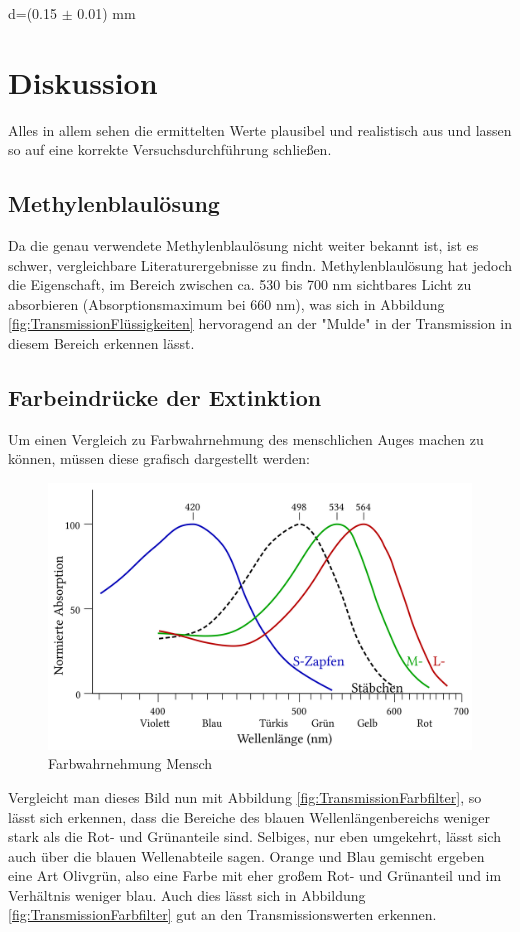 \documentclass[12pt,a4paper,twoside]{article}
\begin{document}
\noindent
d=(0.15 $\pm$ 0.01) mm




\section{Diskussion} %

Alles in allem sehen die ermittelten Werte plausibel und realistisch aus und lassen so auf eine korrekte Versuchsdurchführung schließen.

\subsection{Methylenblaulösung}
Da die genau verwendete Methylenblaulösung nicht weiter bekannt ist, ist es schwer, vergleichbare Literaturergebnisse zu findn.
Methylenblaulösung hat jedoch die Eigenschaft, im Bereich zwischen ca. 530 bis 700 nm sichtbares Licht zu absorbieren (Absorptionsmaximum bei 660 nm), was sich in Abbildung \ref{fig:TransmissionFlüssigkeiten} hervoragend an der "Mulde" in der Transmission in diesem Bereich erkennen lässt.
\cite{Methylenblaulösung}

\subsection{Farbeindrücke der Extinktion}
Um einen Vergleich zu Farbwahrnehmung des menschlichen Auges machen zu können, müssen diese grafisch dargestellt werden:

\begin{figure}[H]
    \centering
    \includegraphics[width=0.5\linewidth]{nudes/Farbwahrnehmung des menschlichen Auges.png}
    \caption{Farbwahrnehmung Mensch \cite{Farbwahrnehmung}}
    \label{fig:FarbwahrnehmungMensch}
\end{figure}

\noindent
Vergleicht man dieses Bild nun mit Abbildung \ref{fig:TransmissionFarbfilter}, so lässt sich erkennen, dass die Bereiche des blauen Wellenlängenbereichs weniger stark als die Rot- und Grünanteile sind. Selbiges, nur eben umgekehrt, lässt sich auch über die blauen Wellenabteile sagen.
Orange und Blau gemischt ergeben eine Art Olivgrün, also eine Farbe mit eher großem Rot- und Grünanteil und im Verhältnis weniger blau. Auch dies lässt sich in Abbildung \ref{fig:TransmissionFarbfilter} gut an den Transmissionswerten erkennen. \newline
\end{document}
